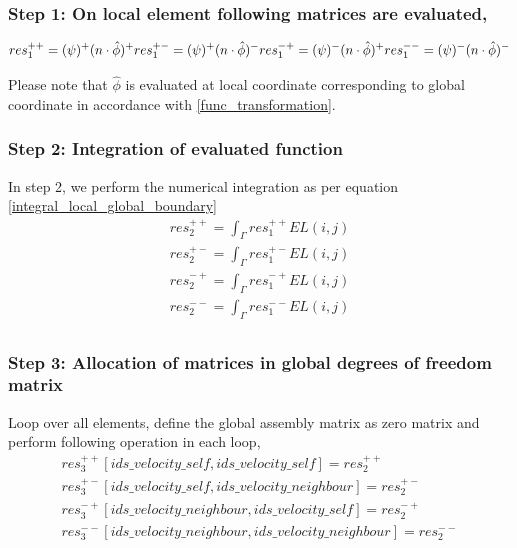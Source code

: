 \documentclass[a4paper]{book}
\begin{document}
\subsubsection{Step 1: On local element following matrices are evaluated,}
\begin{equation}
res_1^{++} = (\psi)^+ (n \cdot \hat{\phi})^+\\
res_1^{+-} = (\psi)^+ (n \cdot \hat{\phi})^-\\
res_1^{-+} = (\psi)^- (n \cdot \hat{\phi})^+\\
res_1^{--} = (\psi)^- (n \cdot \hat{\phi})^-\\
\end{equation}

Please note that $\hat{\phi}$ is evaluated at local coordinate corresponding to global coordinate in accordance with \ref{func_transformation}.

\subsubsection{Step 2: Integration of evaluated function}

In step 2, we perform the numerical integration as per equation \ref{integral_local_global_boundary}
\begin{equation}
\begin{split}
res_2^{++} = \int_{\Gamma} res_1^{++} EL(i,j)\\
res_2^{+-} = \int_{\Gamma} res_1^{+-} EL(i,j)\\
res_2^{-+} = \int_{\Gamma} res_1^{-+} EL(i,j)\\
res_2^{--} = \int_{\Gamma} res_1^{--} EL(i,j)\\
\end{split}
\end{equation}

\subsubsection{Step 3: Allocation of matrices in global degrees of freedom matrix} 

Loop over all elements, define the global assembly matrix as zero matrix and perform following operation in each loop,
\begin{equation}
\begin{split}
res_3^{++}[ids\_velocity\_self,ids\_velocity\_self] = res_2^{++}\\
res_3^{+-}[ids\_velocity\_self,ids\_velocity\_neighbour] = res_2^{+-}\\
res_3^{-+}[ids\_velocity\_neighbour,ids\_velocity\_self] = res_2^{-+}\\
res_3^{--}[ids\_velocity\_neighbour,ids\_velocity\_neighbour] = res_2^{--}\\
\end{split}
\end{equation}
\end{document}

